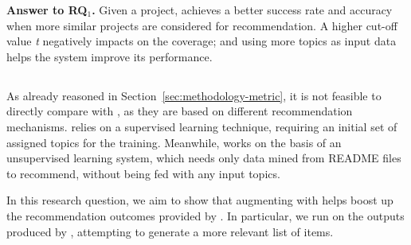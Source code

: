
\begin{tcolorbox}[boxrule=0.86pt,left=0.3em, right=0.3em,top=0.1em, bottom=0.05em]
\textbf{Answer to RQ$_1$.} Given a project, \TFa achieves a better success rate and accuracy 
when more similar projects are considered for recommendation.
A higher cut-off value \emph{t} negatively impacts on the coverage; and using more topics as input data helps the system improve its performance.
\end{tcolorbox}


%

\subsection{\rqsecond} \label{sec:EXP3}

As already reasoned in Section~\ref{sec:methodology-metric}, it is not feasible to directly compare \TF with \MNB, as they are based on different recommendation mechanisms. \TF relies on a supervised learning technique, requiring an initial set of assigned topics for the training. Meanwhile, \MNB works on the basis of an unsupervised learning system, which needs only data mined from README files to recommend, without being fed with any input topics.

In this research question, we aim to show that augmenting \MNB with \TF helps boost up the recommendation outcomes provided by \MNB. In particular, we run \TF on the outputs produced by \MNB, attempting to generate a more relevant list of items. %


